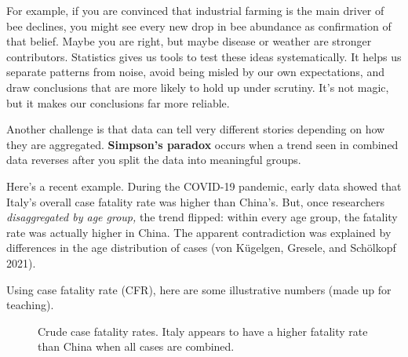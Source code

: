 \documentclass[
  letterpaper,
  DIV=11,
  numbers=noendperiod]{scrreprt}
\begin{document}
For example, if you are convinced that industrial farming is the main
driver of bee declines, you might see every new drop in bee abundance as
confirmation of that belief. Maybe you are right, but maybe disease or
weather are stronger contributors. Statistics gives us tools to test
these ideas systematically. It helps us separate patterns from noise,
avoid being misled by our own expectations, and draw conclusions that
are more likely to hold up under scrutiny. It's not magic, but it makes
our conclusions far more reliable.

Another challenge is that data can tell very different stories depending
on how they are aggregated. \textbf{Simpson's paradox} occurs when a
trend seen in combined data reverses after you split the data into
meaningful groups.

Here's a recent example. During the COVID-19 pandemic, early data showed
that Italy's overall case fatality rate was higher than China's. But,
once researchers \emph{disaggregated by age group,} the trend flipped:
within every age group, the fatality rate was actually higher in China.
The apparent contradiction was explained by differences in the age
distribution of cases (von Kügelgen, Gresele, and Schölkopf 2021).

Using case fatality rate (CFR), here are some illustrative numbers (made
up for teaching).

\begin{figure}


\caption{\label{fig-simpson-covid-overall}Crude case fatality rates.
Italy appears to have a higher fatality rate than China when all cases
are combined.}

\end{figure}%
\end{document}
